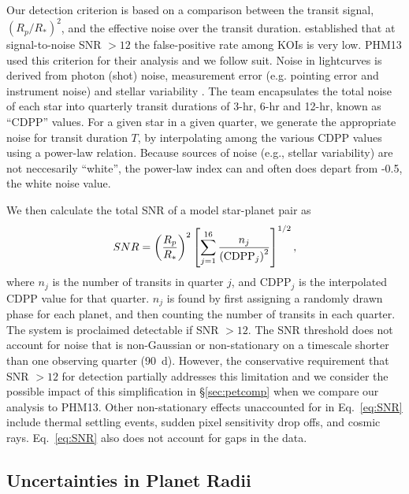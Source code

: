Our detection criterion is based on a comparison
between the transit signal, $(R_p/R_*)^2$, and the
effective noise over the transit duration.  \citet{Fressin2013}
established that at signal-to-noise SNR $>12$ the false-positive rate
among \kep{} KOIs is very low.  PHM13 used this criterion for their
analysis and we follow suit.  Noise in \kep{}
lightcurves is derived from photon (shot) noise, measurement error 
 (e.g. pointing error and instrument noise)
and stellar variability \citep{Koch2010}.  The \kep{} team encapsulates
the total noise of each star into quarterly transit durations of 
3-hr, 6-hr and 12-hr, known as ``CDPP''
\citep[Combined Differential Photometric Precision,][]{Christiansen2012} 
values. For a given star in a given quarter, we generate the appropriate
noise for transit duration $T$, by interpolating among the various
CDPP values using a power-law relation.  Because sources of noise
(e.g., stellar variability) are not neccesarily ``white'', 
the power-law index can and often does depart from -0.5, the
white noise value.

 We then calculate the total SNR of a model star-planet pair as
\begin{equation}
SNR = \left(\frac{R_p}{R_*}\right)^2 \left[\sum\limits_{j=1}^{16}
\frac{n_j}{\left({\rm CDPP}_j\right)^2} \right]^{1/2},
\label{eq:SNR}
\end{equation}
where $n_j$ is the number of transits in quarter $j$, and CDPP$_j$ is
the interpolated CDPP value for that quarter.  $n_j$ is found by
first assigning a randomly drawn phase for each planet, and then counting 
the number of transits in each quarter.  The system is 
proclaimed detectable if SNR $> 12$. The SNR threshold does
not account for noise that is non-Gaussian or non-stationary on a
timescale shorter than one observing quarter (90~d).  However, the
conservative requirement that SNR $> 12$ for detection
partially addresses this limitation and we consider the possible impact 
of this simplification in \S\ref{sec:petcomp} when we compare our analysis 
to PHM13. Other non-stationary effects unaccounted for in Eq.~\ref{eq:SNR}
include thermal settling events, sudden pixel sensitivity drop offs, and cosmic rays.  
Eq.~\ref{eq:SNR} also does not account for gaps in the data.

\subsection{Uncertainties in Planet Radii}
\label{sec:plerr}

